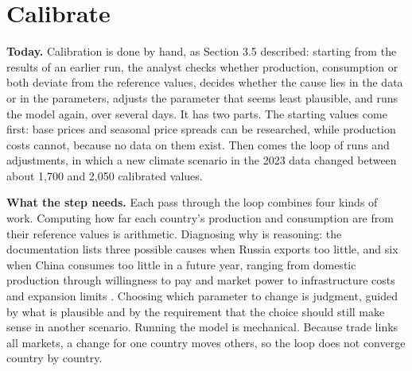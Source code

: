 \section{Calibrate}

\textbf{Today.} Calibration is done by hand, as Section 3.5 described: starting from the results of an earlier run, the analyst checks whether production, consumption or both deviate from the reference values, decides whether the cause lies in the data or in the parameters, adjusts the parameter that seems least plausible, and runs the model again, over several days.
It has two parts.
The starting values come first: base prices and seasonal price spreads can be researched, while production costs cannot, because no data on them exist.
Then comes the loop of runs and adjustments, in which a new climate scenario in the 2023 data changed between about 1,700 and 2,050 calibrated values.

\textbf{What the step needs.} Each pass through the loop combines four kinds of work.
Computing how far each country's production and consumption are from their reference values is arithmetic.
Diagnosing why is reasoning: the documentation lists three possible causes when Russia exports too little, and six when China consumes too little in a future year, ranging from domestic production through willingness to pay and market power to infrastructure costs and expansion limits \citep[p.~26]{egging2019global}.
Choosing which parameter to change is judgment, guided by what is plausible and by the requirement that the choice should still make sense in another scenario.
Running the model is mechanical.
Because trade links all markets, a change for one country moves others, so the loop does not converge country by country.

